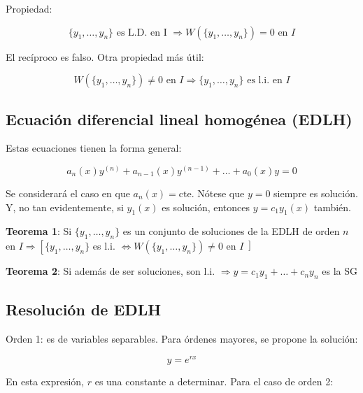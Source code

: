 \documentclass{article}
\begin{document}
Propiedad:

\begin{equation}
\{y_1, \ldots, y_n\} \text{ es L.D. en I } \Rightarrow W(\{y_1, \ldots, y_n\}) = 0 \text{ en } I 
\end{equation}

El recíproco es falso. Otra propiedad más útil:

\begin{equation}
W(\{y_1, \ldots, y_n\}) \neq 0 \text{ en } I \Rightarrow \{y_1, \ldots, y_n\} \text{ es l.i. en } I
\end{equation}

\subsection{Ecuación diferencial lineal homogénea (EDLH)}

Estas ecuaciones tienen la forma general:

\begin{equation}
a_n(x) y^{(n)} + a_{n-1}(x) y^{(n-1)} + \ldots + a_0(x) y = 0
\end{equation}

Se considerará el caso en que $a_n(x) = \text{cte}$. Nótese que $y = 0$ siempre es solución. Y, no tan evidentemente, si $y_1(x)$ es solución, entonces $y = c_1 y_1(x)$ también.

\vspace{10 pt}

\textbf{Teorema 1}: Si $\{y_1, \ldots, y_n\}$ es un conjunto de soluciones de la EDLH de orden $n$ en $I  \Rightarrow \left[ \{y_1, \ldots, y_n\} \right.$ es l.i. $\Leftrightarrow W(\{y_1, \ldots, y_n\}) \neq 0$ en $I \left] \right.$

\vspace{10 pt}

\textbf{Teorema 2}: Si además de ser soluciones, son l.i. $\Rightarrow y = c_1 y_1 + \ldots + c_n y_n $ es la SG

\subsection{Resolución de EDLH}

Orden 1: es de variables separables. Para órdenes mayores, se propone la solución:

\begin{equation}
y = e^{r x}
\end{equation}

En esta expresión, $r$ es una constante a determinar. Para el caso de orden 2:
\end{document}
